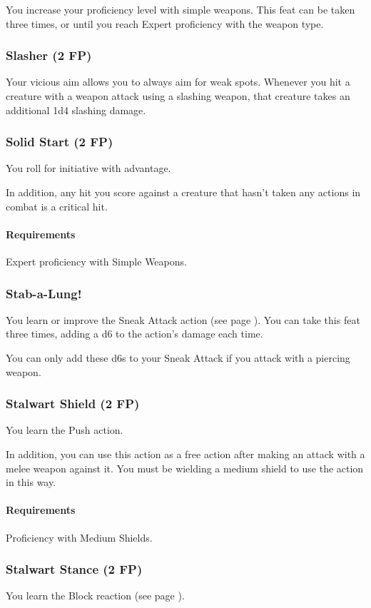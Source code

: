     You increase your proficiency level with simple weapons.
    This feat can be taken three times, or until you reach Expert proficiency with the weapon type.
\subsubsection{Slasher (2 FP)} \label{feat::slasher}
    Your vicious aim allows you to always aim for weak spots.
    Whenever you hit a creature with a weapon attack using a slashing weapon, that creature takes an additional 1d4 slashing damage.
\subsubsection{Solid Start (2 FP)} \label{feat::solidstart}
    You roll for initiative with advantage.

    In addition, any hit you score against a creature that hasn't taken any actions in combat is a critical hit.
    \paragraph{Requirements} Expert proficiency with Simple Weapons.
\subsubsection{Stab-a-Lung!} \label{feat::stabalung}
    You learn or improve the Sneak Attack action (see page \pageref{act::sneakattack}).
    You can take this feat three times, adding a d6 to the action's damage each time.

    You can only add these d6s to your Sneak Attack if you attack with a piercing weapon.
\subsubsection{Stalwart Shield (2 FP)} \label{feat::stalwartshield}
    You learn the Push action.

    In addition, you can use this action as a free action after making an attack with a melee weapon against it.
    You must be wielding a medium shield to use the action in this way.
    \paragraph{Requirements} Proficiency with Medium Shields.
\subsubsection{Stalwart Stance (2 FP)} \label{feat::stalwartstance}
    You learn the Block reaction (see page \pageref{act::block}).

